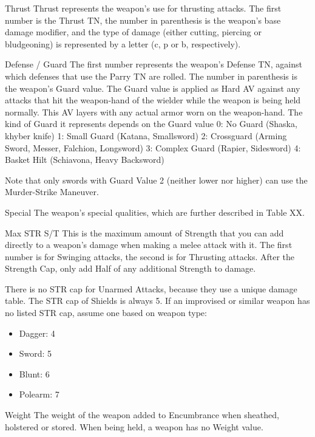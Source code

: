 \documentclass[oneside,11pt,english]{book}
\begin{document}
 

Thrust 
Thrust represents the weapon’s use for thrusting attacks. The first number is the Thrust TN, the number in 
parenthesis is the weapon’s base damage modifier, and the type of damage (either cutting, piercing or 
bludgeoning) is represented by a letter (c, p or b, respectively). 

 

Defense / Guard 
The first number represents the weapon’s Defense TN, against which defenses that use the Parry TN are 
rolled. The number in parenthesis is the weapon’s Guard value. The Guard value is applied as Hard AV 
against any attacks that hit the weapon-hand of the wielder while the weapon is being held normally. This 
AV layers with any actual armor worn on the weapon-hand. The kind of Guard it represents depends on 
the Guard value 
0: No Guard (Shaska, khyber knife) 
1: Small Guard (Katana, Smallsword) 
2: Crossguard (Arming Sword, Messer, Falchion, Longsword) 
3: Complex Guard (Rapier, Sidesword) 
4: Basket Hilt (Schiavona, Heavy Backsword) 

 

Note that only swords with Guard Value 2 (neither lower nor higher) can use the Murder-Strike 
Maneuver. 

 

Special 
The weapon’s special qualities, which are further described in Table XX. 

 

Max STR S/T 
This is the maximum amount of Strength that you can add directly to a weapon’s damage when making a 
melee attack with it. The first number is for Swinging attacks, the second is for Thrusting attacks. 
After the Strength Cap, only add Half of any additional Strength to damage. 

 

There is no STR cap for Unarmed Attacks, because they use a unique damage table. The STR cap of 
Shields is always 5. If an improvised or similar weapon has no listed STR cap, assume one based on 
weapon type: 
\begin{itemize}
\item Dagger: 4 
\item Sword: 5 
\item Blunt: 6 
\item Polearm: 7 
\end{itemize}
 

Weight 
The weight of the weapon added to Encumbrance when sheathed, holstered or stored. When being held, a 
weapon has no Weight value. 
\end{document}
